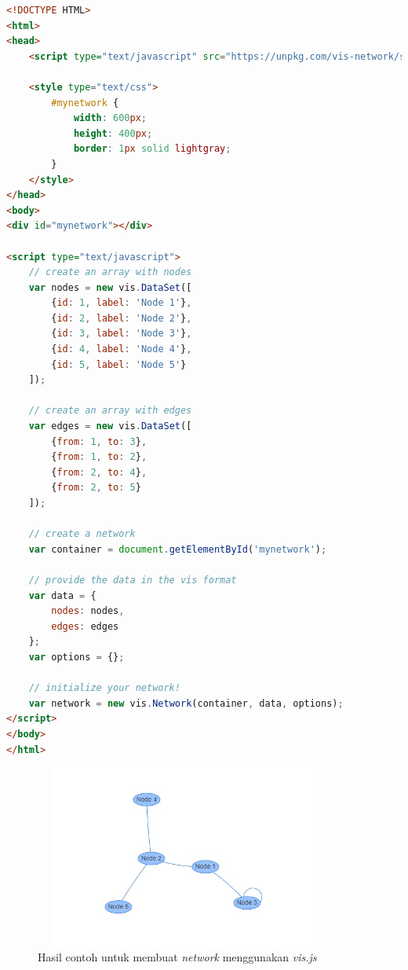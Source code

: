 \begin{lstlisting}[language=HTML, caption=Contoh kode untuk membuat \textit{network} menggunakan \textit{vis.js}\label{lst:kodeNetwork}]
<!DOCTYPE HTML>
<html>
<head>
    <script type="text/javascript" src="https://unpkg.com/vis-network/standalone/umd/vis-network.min.js"></script>

    <style type="text/css">
        #mynetwork {
            width: 600px;
            height: 400px;
            border: 1px solid lightgray;
        }
    </style>
</head>
<body>
<div id="mynetwork"></div>

<script type="text/javascript">
    // create an array with nodes
    var nodes = new vis.DataSet([
        {id: 1, label: 'Node 1'},
        {id: 2, label: 'Node 2'},
        {id: 3, label: 'Node 3'},
        {id: 4, label: 'Node 4'},
        {id: 5, label: 'Node 5'}
    ]);

    // create an array with edges
    var edges = new vis.DataSet([
        {from: 1, to: 3},
        {from: 1, to: 2},
        {from: 2, to: 4},
        {from: 2, to: 5}
    ]);

    // create a network
    var container = document.getElementById('mynetwork');

    // provide the data in the vis format
    var data = {
        nodes: nodes,
        edges: edges
    };
    var options = {};

    // initialize your network!
    var network = new vis.Network(container, data, options);
</script>
</body>
</html>
\end{lstlisting}

\begin{figure}[H]
    \centering
    \includegraphics[width=10cm, height=6cm]{Gambar/hasilNetwork.jpg}
    \caption{Hasil contoh untuk membuat \textit{network} menggunakan \textit{vis.js}}
    \label{fig:gambarHasilNetwork}
\end{figure}

